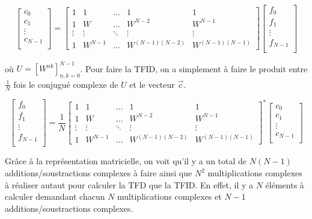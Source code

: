 \begin{equation*} 
    \begin{bmatrix}
        c_0 \\
        c_1 \\
        \vdots \\
        c_{N-1} \\
    \end{bmatrix}
    =
    \begin{bmatrix}
        1 & 1 & \dots & 1 & 1\\
        1 & W & \dots & W^{N-2} & W^{N-1}\\
        \vdots & \vdots & \ddots & \vdots & \vdots\\
        1 & W^{N-1} & \dots & W^{(N-1)(N-2)} & W^{(N-1)(N-1)}
    \end{bmatrix}
    \begin{bmatrix}
        f_0 \\
        f_1 \\
        \vdots \\
        f_{N-1} \\
    \end{bmatrix}
\end{equation*}

où $U = \left[W^{nk}\right]_{n,k=0}^{N-1}$. Pour faire la TFID, on a simplement à faire le produit entre $\frac{1}{N}$ fois le conjugué complexe de $U$ et le vecteur $\vec{c}$.

\begin{equation*} 
    \begin{bmatrix}
        f_0 \\
        f_1 \\
        \vdots \\
        f_{N-1} \\
    \end{bmatrix}
    = \frac{1}{N}
    \begin{bmatrix}
        1 & 1 & \dots & 1 & 1\\
        1 & W & \dots & W^{N-2} & W^{N-1}\\
        \vdots & \vdots & \ddots & \vdots & \vdots\\
        1 & W^{N-1} & \dots & W^{(N-1)(N-2)} & W^{(N-1)(N-1)}
    \end{bmatrix}^*
    \begin{bmatrix}
        c_0 \\
        c_1 \\
        \vdots \\
        c_{N-1} \\
    \end{bmatrix}
\end{equation*}

Grâce à la représentation matricielle, on voit qu'il y a un total de $N (N-1)$ additions/soustractions complexes à faire ainsi que $N^2$ multiplications complexes à réaliser autaut pour calculer la TFD que la TFID. En effet, il y a $N$ éléments à calculer demandant chacun $N$ multiplications complexes et $N-1$ additions/soustractions complexes. 
